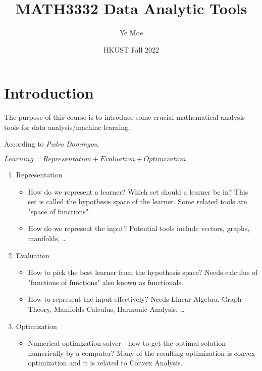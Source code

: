 \documentclass{article}
\title{MATH3332 Data Analytic Tools}
\author{Ye Moe}
\date{HKUST Fall 2022}
\begin{document}
\maketitle

\section*{Introduction}


The purpose of this course is to introduce some crucial mathematical analysis tools for data analysis/machine learning. 



According to \textit{Pedro Domingos},

\begin{center}
    $Learning = Representation + Evaluation + Optimization$
\end{center}


\begin{enumerate}
    \item Representation
    \begin{itemize}
        \item How do we represent a learner? Which set should a learner be in? This set is called the hypothesis space of the learner. Some related tools are "space of functions".
        \item How do we represent the input? Potential tools include vectors, graphs, manifolds, \dots
    \end{itemize}
    
    \item Evaluation 
    \begin{itemize}
        \item How to pick the best learner from the hypothesis space? Needs calculus of "functions of functions" also known as functionals.
        \item How to represent the input effectively? Needs Linear Algebra, Graph Theory, Manifolds Calculus, Harmonic Analysis, \dots
        
    \end{itemize}
    
    \item Optimization
    \begin{itemize}
        \item Numerical optimization solver - how to get the optimal solution numerically by a computer? Many of the resulting optimization is convex optimization and it is related to Convex Analysis.
    \end{itemize}
\end{enumerate}
\end{document}
